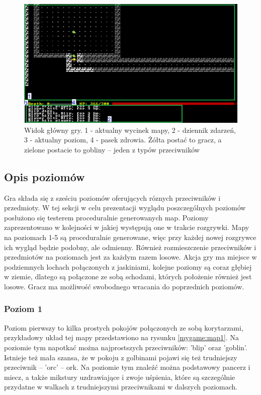 \documentclass[12pt,twoside]{article}
\begin{document}
\FloatBarrier
\begin{figure}[h]
	\centering
	\includegraphics[width=16cm]{images/mygame/game_window.png}
	\caption{Widok główny gry. 1 - aktualny wycinek mapy, 2 - dziennik zdarzeń, 3 - aktualny poziom, 4 - pasek zdrowia. Żółta postać to gracz, a zielone postacie to gobliny -- jeden z typów przeciwników }
	\label{mygame:game_window}
\end{figure}
\FloatBarrier


\subsection{Opis poziomów}
Gra składa się z sześciu poziomów oferujących róznych przeciwników i przedmioty. W tej sekcji w celu prezentacji wyglądu poszczególnych poziomów posłużono się testerem proceduralnie generowanych map. Poziomy zaprezentowano w kolejności w jakiej występują one w trakcie rozgrywki. Mapy na poziomach 1-5 są proceduralnie generowane, więc przy każdej nowej rozgrywce ich wygląd będzie podobny, ale odmienny. Również rozmieszczenie przeciwników i przedmiotów na poziomach jest za każdym razem losowe. Akcja gry ma miejsce w podziemnych lochach połączonych z jaskiniami, kolejne poziomy są coraz głębiej w ziemie, dlatego są połączone ze sobą schodami, których położenie również jest losowe. Gracz ma możliwość swobodnego wracania do poprzednich poziomów.

\subsubsection{Poziom 1}
Poziom pierwszy to kilka prostych pokojów połączonych ze sobą korytarzami, przykładowy układ tej mapy przedstawiono na rysunku \ref{mygame:map1}. Na poziomie tym napotkać można najprostszych przeciwników: 'blip' oraz 'goblin'. Istnieje też mała szansa, że w pokoju z golbinami pojawi się też trudniejszy przeciwnik -- 'orc' -- ork. Na poziomie tym znaleźć można podstawowy pancerz i miecz, a także mikstury uzdrawiające i zwoje uśpienia, które są szczególnie przydatne w walkach z trudniejszymi przeciwnikami w dalszych poziomach.
\end{document}
